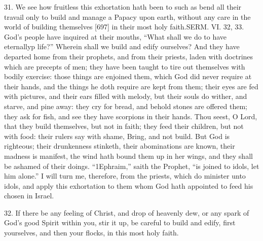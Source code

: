 31. We see how fruitless this exhortation hath been to such as bend all their travail only to build and manage a Papacy upon earth, without any care in the world of building themselves [697] in their most holy faith.SERM. VI. 32, 33. God’s people have inquired at their mouths, “What shall we do to have eternallyp life?” Wherein shall we build and edify ourselves? And they have departed home from their prophets, and from their priests, laden with doctrines which are precepts of men; they have been taught to tire out themselves with bodily exercise: those things are enjoined them, which God did never require at their hands, and the things he doth require are kept from them; their eyes are fed with pictures, and their ears filled with melody, but their souls do wither, and starve, and pine away: they cry for bread, and behold stones are offered them; they ask for fish, and see they have scorpions in their hands. Thou seest, O Lord, that they build themselves, but not in faith; they feed their children, but not with food: their rulers say with shame, Bring, and not build. But God is righteous; their drunkenness stinketh, their abominations are known, their madness is manifest, the wind hath bound them up in her wings, and they shall be ashamed of their doings. “1Ephraim,” saith the Prophet, “is joined to idols, let him alone.” I will turn me, therefore, from the priests, which do minister unto idols, and apply this exhortation to them whom God hath appointed to feed his chosen in Israel.

32. If there be any feeling of Christ, and drop of heavenly dew, or any spark of God’s good Spirit within you, stir it up, be careful to build and edify, first yourselves, and then your flocks, in this most holy faith.

